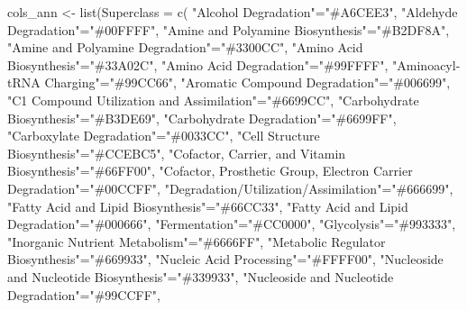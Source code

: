 \documentclass[]{interact}
\theoremstyle{plain}%
\theoremstyle{definition}
\theoremstyle{remark}
\newenvironment{Shaded}{\begin{snugshade}}{\end{snugshade}}
\newcommand{\FunctionTok}[1]{\textcolor[rgb]{0.00,0.00,0.00}{#1}}
\newcommand{\NormalTok}[1]{#1}
\newcommand{\OtherTok}[1]{\textcolor[rgb]{0.56,0.35,0.01}{#1}}
\newcommand{\StringTok}[1]{\textcolor[rgb]{0.31,0.60,0.02}{#1}}
\begin{document}
\begin{Shaded}
\begin{Highlighting}[]
\NormalTok{cols\_ann }\OtherTok{\textless{}{-}} \FunctionTok{list}\NormalTok{(}\StringTok{\textquotesingle{}Superclass\textquotesingle{}} \OtherTok{=} \FunctionTok{c}\NormalTok{(}
  \StringTok{"Alcohol Degradation"}\OtherTok{=}\StringTok{"\#A6CEE3"}\NormalTok{,}
  \StringTok{"Aldehyde Degradation"}\OtherTok{=}\StringTok{"\#00FFFF"}\NormalTok{,}
  \StringTok{"Amine and Polyamine Biosynthesis"}\OtherTok{=}\StringTok{"\#B2DF8A"}\NormalTok{,}
  \StringTok{"Amine and Polyamine Degradation"}\OtherTok{=}\StringTok{"\#3300CC"}\NormalTok{,}
  \StringTok{"Amino Acid Biosynthesis"}\OtherTok{=}\StringTok{"\#33A02C"}\NormalTok{,}
  \StringTok{"Amino Acid Degradation"}\OtherTok{=}\StringTok{"\#99FFFF"}\NormalTok{,}
  \StringTok{"Aminoacyl{-}tRNA Charging"}\OtherTok{=}\StringTok{"\#99CC66"}\NormalTok{,}
  \StringTok{"Aromatic Compound Degradation"}\OtherTok{=}\StringTok{"\#006699"}\NormalTok{,}
  \StringTok{"C1 Compound Utilization and Assimilation"}\OtherTok{=}\StringTok{"\#6699CC"}\NormalTok{,}
  \StringTok{"Carbohydrate Biosynthesis"}\OtherTok{=}\StringTok{"\#B3DE69"}\NormalTok{,}
  \StringTok{"Carbohydrate Degradation"}\OtherTok{=}\StringTok{"\#6699FF"}\NormalTok{,}
  \StringTok{"Carboxylate Degradation"}\OtherTok{=}\StringTok{"\#0033CC"}\NormalTok{,}
  \StringTok{"Cell Structure Biosynthesis"}\OtherTok{=}\StringTok{"\#CCEBC5"}\NormalTok{,}
  \StringTok{"Cofactor, Carrier, and Vitamin Biosynthesis"}\OtherTok{=}\StringTok{"\#66FF00"}\NormalTok{,}
  \StringTok{"Cofactor, Prosthetic Group, Electron Carrier Degradation"}\OtherTok{=}\StringTok{"\#00CCFF"}\NormalTok{,}
  \StringTok{"Degradation/Utilization/Assimilation"}\OtherTok{=}\StringTok{"\#666699"}\NormalTok{,}
  \StringTok{"Fatty Acid and Lipid Biosynthesis"}\OtherTok{=}\StringTok{"\#66CC33"}\NormalTok{,}
  \StringTok{"Fatty Acid and Lipid Degradation"}\OtherTok{=}\StringTok{"\#000666"}\NormalTok{,}
  \StringTok{"Fermentation"}\OtherTok{=}\StringTok{"\#CC0000"}\NormalTok{,}
  \StringTok{"Glycolysis"}\OtherTok{=}\StringTok{"\#993333"}\NormalTok{,}
  \StringTok{"Inorganic Nutrient Metabolism"}\OtherTok{=}\StringTok{"\#6666FF"}\NormalTok{,}
  \StringTok{"Metabolic Regulator Biosynthesis"}\OtherTok{=}\StringTok{"\#669933"}\NormalTok{,}
  \StringTok{"Nucleic Acid Processing"}\OtherTok{=}\StringTok{"\#FFFF00"}\NormalTok{,}
  \StringTok{"Nucleoside and Nucleotide Biosynthesis"}\OtherTok{=}\StringTok{"\#339933"}\NormalTok{,}
  \StringTok{"Nucleoside and Nucleotide Degradation"}\OtherTok{=}\StringTok{"\#99CCFF"}\NormalTok{,}

\end{Highlighting}
\end{Shaded}
\end{document}
